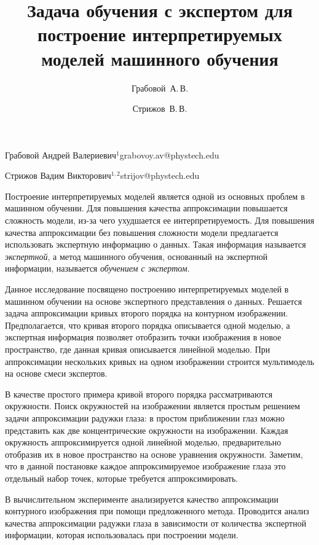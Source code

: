 \documentclass[twoside]{article}
\begin{document}
\Russian
\title{Задача обучения с экспертом для построение интерпретируемых моделей машинного обучения}
\author{Грабовой~А.\,В.}{Грабовой Андрей Валериевич$^{1}$\speaker}{grabovoy.av@phystech.edu}
\author{Стрижов~В.\,В.}{Стрижов Вадим Викторович$^{1,2}$}{strijov@phystech.edu}
\maketitle

Построение интерпретируемых моделей является одной из основных проблем в машинном обучении. Для повышения качества аппроксимации  повышается сложность модели, из-за чего ухудшается ее интерпретируемость. Для повышения качества аппроксимации без повышения сложности модели предлагается использовать экспертную информацию о данных. Такая информация называется \textit{экспертной}, а метод машинного обучения, основанный на экспертной информации, называется \textit{обучением с экспертом}.

Данное исследование посвящено построению интерпретируемых моделей в машинном обучении на основе экспертного представления о данных. Решается задача аппроксимации кривых второго порядка на контурном изображении. Предполагается, что кривая второго порядка описывается одной моделью, а экспертная информация позволяет отобразить точки изображения в новое пространство, где данная кривая описывается линейной моделью. При аппроксимации нескольких кривых на одном изображении строится мультимодель на основе смеси экспертов.

В качестве простого примера кривой второго порядка рассматриваются окружности. Поиск окружностей на изображении является простым решением задачи аппроксимации радужки глаза: в простом приближении глаз можно представить как две концентрические окружности на изображении. Каждая окружность аппроксимируется одной линейной моделью, предварительно отобразив их в новое пространство на основе уравнения окружности. Заметим, что в данной постановке каждое аппроксимируемое изображение глаза это отдельный набор точек, которые требуется аппроксимировать.

В вычислительном эксперименте анализируется качество аппроксимации контурного изображения при помощи предложенного метода. Проводится анализ качества аппроксимации радужки глаза в зависимости от количества экспертной информации, которая использовалась при построении модели. 
\end{document}
